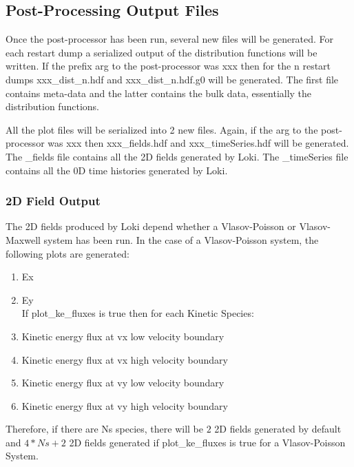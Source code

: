 \documentclass[11pt]{amsart}
\begin{document}
\subsection*{Post-Processing Output Files}
Once the post-processor has been run, several new files will be generated.  For
each restart dump a serialized output of the distribution functions will be
written.  If the prefix arg to the post-processor was xxx then for the n
restart dumps xxx\_dist\_n.hdf and xxx\_dist\_n.hdf.g0 will be generated.  The
first file contains meta-data and the latter contains the bulk data,
essentially the distribution functions.

All the plot files will be serialized into 2 new files.  Again, if the arg to
the post-processor was xxx then xxx\_fields.hdf and xxx\_timeSeries.hdf will be
generated.  The \_fields file contains all the 2D fields generated by Loki.
The \_timeSeries file contains all the 0D time histories generated by Loki.

\subsubsection*{2D Field Output}
The 2D fields produced by Loki depend whether a Vlasov-Poisson or
Vlasov-Maxwell system has been run.  In the case of a Vlasov-Poisson system,
the following plots are generated:
\begin{enumerate}
\item Ex
\item Ey \\
If plot\_ke\_fluxes is true then for each Kinetic Species:
\item Kinetic energy flux at vx low velocity boundary
\item Kinetic energy flux at vx high velocity boundary
\item Kinetic energy flux at vy low velocity boundary
\item Kinetic energy flux at vy high velocity boundary
\end{enumerate}
Therefore, if there are Ns species, there will be $2$ 2D fields generated by
default and $4*Ns+2$ 2D fields generated if plot\_ke\_fluxes is true for a
Vlasov-Poisson System.
\end{document}
